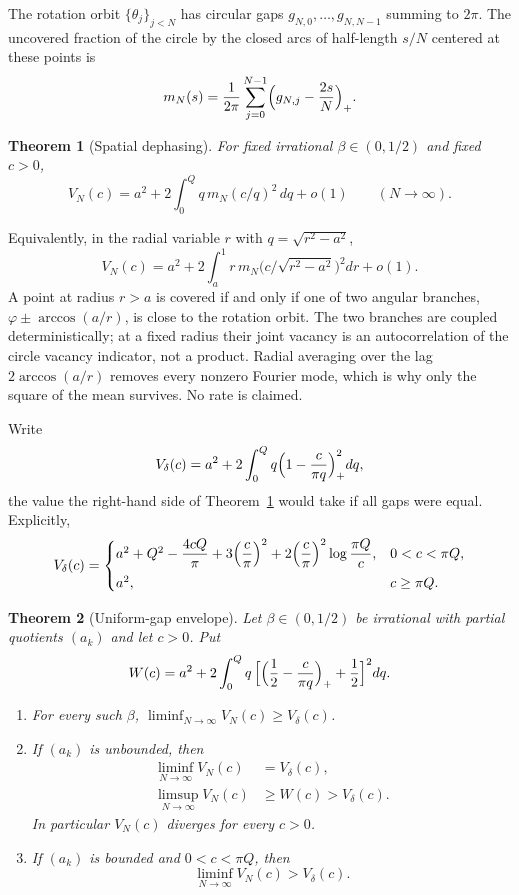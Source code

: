 \documentclass[11pt]{amsart}
\newtheorem{mainthm}{Theorem}
\theoremstyle{remark}
\newcommand{\Vd}{V_\delta}
\begin{document}
The rotation orbit $\{\theta_j\}_{j<N}$ has circular gaps $g_{N,0},\dots,g_{N,N-1}$
summing to $2\pi$. The uncovered fraction of the circle by the closed arcs of
half-length $s/N$ centered at these points is
\begin{equation}\label{eq:mN}
m_N(s)=\frac{1}{2\pi}\sum_{j=0}^{N-1}\Bigl(g_{N,j}-\frac{2s}{N}\Bigr)_+ .
\end{equation}

\begin{mainthm}[Spatial dephasing]\label{thm:A}
For fixed irrational $\beta\in(0,1/2)$ and fixed $c>0$,
\[
V_N(c)=a^2+2\int_0^{Q} q\,m_N(c/q)^2\,dq+o(1)\qquad(N\to\infty).
\]
\end{mainthm}

Equivalently, in the radial variable $r$ with $q=\sqrt{r^2-a^2}$,
\[
V_N(c)=a^2+2\int_a^1 r\,m_N\bigl(c/\sqrt{r^2-a^2}\bigr)^2dr+o(1).
\]
A point at radius $r>a$ is covered if and only if one of two angular branches,
$\varphi\pm\arccos(a/r)$, is close to the rotation orbit. The two branches are coupled
deterministically; at a fixed radius their joint vacancy is an autocorrelation of the
circle vacancy indicator, not a product. Radial averaging over the lag $2\arccos(a/r)$
removes every nonzero Fourier mode, which is why only the square of the mean survives.
No rate is claimed.

Write
\begin{equation}\label{eq:Vd}
\Vd(c)=a^2+2\int_0^Q q\Bigl(1-\frac{c}{\pi q}\Bigr)_+^2dq ,
\end{equation}
the value the right-hand side of Theorem~\ref{thm:A} would take if all gaps were equal.
Explicitly,
\[
\Vd(c)=\begin{cases}
a^2+Q^2-\dfrac{4cQ}{\pi}+3\Bigl(\dfrac c\pi\Bigr)^2+2\Bigl(\dfrac c\pi\Bigr)^2\log\dfrac{\pi Q}{c}, & 0<c<\pi Q,\\[1.5ex]
a^2, & c\ge\pi Q .
\end{cases}
\]

\begin{mainthm}[Uniform-gap envelope]\label{thm:B}
Let $\beta\in(0,1/2)$ be irrational with partial quotients $(a_k)$ and let $c>0$. Put
\begin{equation}\label{eq:W}
W(c)=a^2+2\int_0^Q q\,\Bigl[\Bigl(\frac12-\frac{c}{\pi q}\Bigr)_++\frac12\Bigr]^2dq .
\end{equation}
\begin{enumerate}
\item For every such $\beta$, $\liminf_{N\to\infty} V_N(c)\ge \Vd(c)$.
\item If $(a_k)$ is unbounded, then
\begin{align*}
\liminf_{N\to\infty} V_N(c)&=\Vd(c),\\
\limsup_{N\to\infty} V_N(c)&\ge W(c)>\Vd(c).
\end{align*}
In particular $V_N(c)$ diverges for every $c>0$.
\item If $(a_k)$ is bounded and $0<c<\pi Q$, then
\[
\liminf_{N\to\infty} V_N(c)>\Vd(c).
\]
\end{enumerate}
\end{mainthm}
\end{document}

